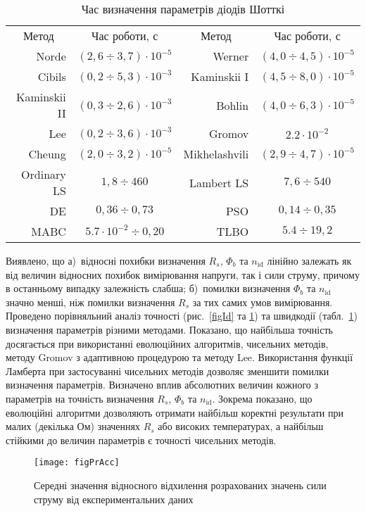 \begin{table}[t]
\caption{\label{tabRT}Час визначення параметрів діодів Шотткі}
\centering
\begin{tabular}{|r|c|r|c|}
\hline
\multicolumn{1}{|c|}{Метод}&Час роботи, с &\multicolumn{1}{c|}{Метод}&Час роботи, с\\ \hhline{|====|}
Norde &$(2,6\div3,7)\cdot10^{-5}$& Werner  &$(4,0\div4,5)\cdot10^{-5}$\\ \hline
Cibils  &$(0,2\div5,3)\cdot10^{-3}$& Kaminskii I &$(4,5\div8,0)\cdot10^{-5}$\\ \hline
Kaminskii II &$(0,3\div2,6)\cdot10^{-3}$& Bohlin &$(4,0\div6,3)\cdot10^{-5}$\\ \hline
Lee &$(0,2\div3,6)\cdot10^{-3}$& Gromov &$2.2\cdot10^{-2}$\\ \hline
Cheung &$(2,0\div3,2)\cdot10^{-5}$&Mikhelashvili &$(2,9\div4,7)\cdot10^{-5}$\\ \hline
Ordinary LS &$1,8\div460$&Lambert LS &$7,6\div540$\\ \hline
DE &$0,36\div0,73$&PSO &$0,14\div0,35$\\ \hline
MABC &$5.7\cdot10^{-2}\div0,20$&TLBO &$5.4\div19,2$ \\
\hline
\end{tabular}
\end{table}

Виявлено, що
а)~відносні похибки визначення $R_s$, $\Phi_b$ та $n_\mathrm{id}$ лінійно залежать як від величин відносних похибок вимірювання напруги, так і сили струму, причому в останньому випадку залежність слабша;
б)~помилки визначення $\Phi_b$ та $n_\mathrm{id}$ значно менші, ніж помилки визначення $R_s$ за тих самих умов вимірювання.
Проведено порівняльний аналіз точності (рис.~\ref{figId} та \ref{figPrAcc}) та швидкодії (табл.~\ref{tabRT}) визначення параметрів різними методами.
Показано, що найбільша точність досягається при використанні еволюцiйних алгоритмів, чисельних методів, методу Gromov з адаптивною процедурою та методу Lee.
Використання функції Ламберта при застосуванні чисельних методів дозволяє зменшити помилки визначення параметрів.
Визначено вплив абсолютних величин кожного з параметрів на точність визначення $R_s$, $\Phi_b$ та $n_\mathrm{id}$.
Зокрема показано, що еволюційні алгоритми дозволяють отримати найбільш коректні результати при малих (декілька Ом) значеннях $R_s$ або високих температурах, а найбільш стійкими до величин параметрів є точності чисельних методів.
\begin{figure}[ht]
\center
\texttt{[image: figPrAcc]}%
\caption{\label{figPrAcc}
Середні значення відносного відхилення розрахованих значень сили струму від експериментальних даних
}
\end{figure}

